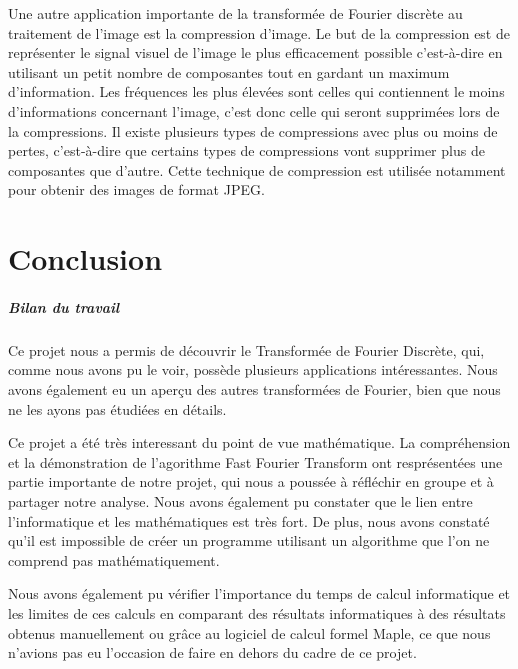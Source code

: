\documentclass{report}
\begin{document}
	Une autre application importante de la transformée de Fourier discrète au traitement de l’image est la compression d’image. Le but de la compression est de représenter le signal visuel de l’image le plus efficacement possible c'est-à-dire en utilisant un petit nombre de composantes tout en gardant un maximum d’information. Les fréquences les plus élevées sont celles qui contiennent le moins d’informations concernant l’image, c’est donc celle qui seront supprimées lors de la compressions. Il existe plusieurs types de compressions avec plus ou moins de pertes, c'est-à-dire que certains types de compressions vont supprimer plus de composantes que d’autre. 
	Cette technique de compression est utilisée notamment pour obtenir des images de format JPEG.



	\chapter{Conclusion}
	\paragraph{Bilan du travail}
	Ce projet nous a permis de découvrir le Transformée de Fourier Discrète, qui, comme nous avons pu le voir, possède plusieurs applications intéressantes. Nous avons également eu un aperçu des autres transformées de Fourier, bien que nous ne les ayons pas étudiées en détails.
	
	Ce projet a été très interessant du point de vue mathématique. La compréhension et la démonstration de l'agorithme Fast Fourier Transform ont resprésentées une partie importante de notre projet, qui nous a poussée à réfléchir en groupe et à partager notre analyse. Nous avons également pu constater que le lien entre l'informatique et les mathématiques est très fort. De plus, nous avons constaté qu'il est impossible de créer un programme utilisant un algorithme que l'on ne comprend pas mathématiquement.
	
	Nous avons également pu vérifier l'importance du temps de calcul informatique et les limites de ces calculs en comparant des résultats informatiques à des résultats obtenus manuellement ou grâce au logiciel de calcul formel Maple, ce que nous n'avions pas eu l'occasion de faire en dehors du cadre de ce projet.
\end{document}
